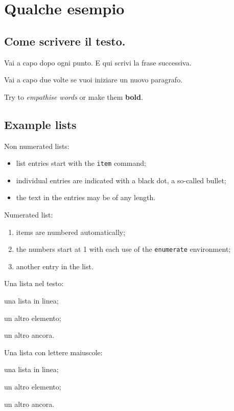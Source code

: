 \chapter{Qualche esempio}

\section{Come scrivere il testo.}

Vai a capo dopo ogni punto.
E qui scrivi la frase successiva.

Vai a capo due volte se vuoi iniziare un nuovo paragrafo.

Try to \emph{empathise words} or make them \textbf{bold}.

\section{Example lists}

Non numerated lists:
\begin{itemize}
  \item list entries start with the \texttt{item} command;
  \item individual entries are indicated with a black dot, a so-called bullet;
  \item the text in the entries may be of any length.
\end{itemize}

Numerated list:
\begin{enumerate}
  \item items are numbered automatically;
  \item the numbers start at 1 with each use of the \texttt{enumerate} environment;
  \item another entry in the list.
\end{enumerate}

Una lista nel testo:
\begin{itemize*}
    \item una lista in linea;
    \item un altro elemento;
    \item un altro ancora.
\end{itemize*}

Una lista con lettere maiuscole:
\begin{enumerate*}[label=\Alph*)]
    \item una lista in linea;
    \item un altro elemento;
    \item un altro ancora.
\end{enumerate*}

